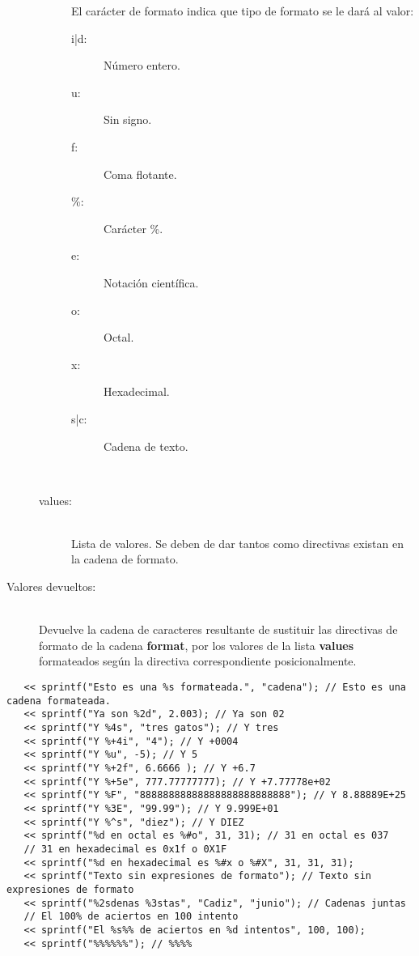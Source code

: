 \begin{framed}
\begin{description}
\begin{description}
		El carácter de formato indica que tipo de formato se le dará al valor: 
		\begin{description}
			\item[  i|d:] Número entero.
			\item[  u:] Sin signo.
			\item[  f:] Coma flotante.
			\item[  \%:] Carácter \%.
			\item[  e:] Notación científica.
			\item[  o:] Octal.
			\item[  x:] Hexadecimal.
			\item[  s|c:] Cadena de texto.
		\end{description} \hfill \\
   \item[values:] \hfill \\ Lista de valores. Se deben de dar tantos como directivas existan en la cadena de formato.
      
   \end{description}
\item[Valores devueltos:] \hfill \\
   Devuelve la cadena de caracteres resultante de sustituir las directivas de formato de la cadena \textbf{format}, por los valores  de la lista \textbf{values} formateados 
   según la directiva correspondiente posicionalmente.
\end{description}
\end{framed}

\begin{lstlisting}   
   << sprintf("Esto es una %s formateada.", "cadena"); // Esto es una cadena formateada.
   << sprintf("Ya son %2d", 2.003); // Ya son 02
   << sprintf("Y %4s", "tres gatos"); // Y tres
   << sprintf("Y %+4i", "4"); // Y +0004
   << sprintf("Y %u", -5); // Y 5
   << sprintf("Y %+2f", 6.6666 ); // Y +6.7
   << sprintf("Y %+5e", 777.77777777); // Y +7.77778e+02
   << sprintf("Y %F", "88888888888888888888888888"); // Y 8.88889E+25
   << sprintf("Y %3E", "99.99"); // Y 9.999E+01
   << sprintf("Y %^s", "diez"); // Y DIEZ
   << sprintf("%d en octal es %#o", 31, 31); // 31 en octal es 037
   // 31 en hexadecimal es 0x1f o 0X1F
   << sprintf("%d en hexadecimal es %#x o %#X", 31, 31, 31); 
   << sprintf("Texto sin expresiones de formato"); // Texto sin expresiones de formato
   << sprintf("%2sdenas %3stas", "Cadiz", "junio"); // Cadenas juntas
   // El 100% de aciertos en 100 intento
   << sprintf("El %s%% de aciertos en %d intentos", 100, 100); 
   << sprintf("%%%%%%"); // %%%%
\end{lstlisting}

